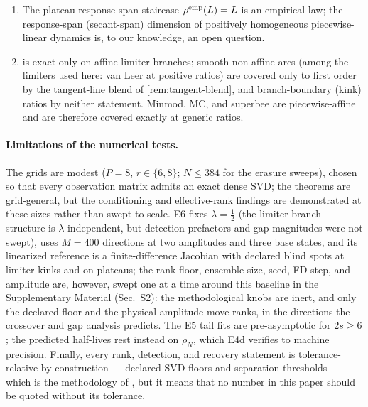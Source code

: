 \documentclass[pdflatex,sn-mathphys-num]{sn-jnl}%
\theoremstyle{thmstyleone}%
\theoremstyle{thmstyletwo}%
\theoremstyle{thmstylethree}%
\begin{document}
\begin{enumerate}
\item[(v)] The plateau response-span staircase $\rho^{\rm emp}(L)=L$ is an empirical law; the response-span (secant-span) dimension of positively homogeneous piecewise-linear dynamics is, to our knowledge, an open question.
\item[(vi)]  is exact only on affine limiter branches; smooth non-affine arcs (among the limiters used here: van Leer at positive ratios) are covered only to first order by the tangent-line blend of \cref{rem:tangent-blend}, and branch-boundary (kink) ratios by neither statement.
      Minmod, MC, and superbee are piecewise-affine and are therefore covered exactly at generic ratios.
\end{enumerate}

\paragraph{Limitations of the numerical tests.}
The grids are modest ($P=8$, $r\in\{6,8\}$; $N\le384$ for the erasure sweeps), chosen so that every observation matrix admits an exact dense SVD; the theorems are grid-general, but the conditioning and effective-rank findings are demonstrated at these sizes rather than swept to scale.
E6 fixes $\lambda=\tfrac12$ (the limiter branch structure is $\lambda$-independent, but detection prefactors and gap magnitudes were not swept), uses $M=400$ directions at two amplitudes and three base states, and its linearized reference is a finite-difference Jacobian with declared blind spots at limiter kinks and on plateaus; the rank floor, ensemble size, seed, FD step, and amplitude are, however, swept one at a time around this baseline in the Supplementary Material (Sec.~S2): the methodological knobs are inert, and only the declared floor and the physical amplitude move ranks, in the directions the crossover and gap analysis predicts.
The E5 tail fits are pre-asymptotic for $2s\ge6$; the predicted half-lives rest instead on $\rho_N$, which E4d verifies to machine precision.
Finally, every rank, detection, and recovery statement is tolerance-relative by construction --- declared SVD floors and separation thresholds --- which is the methodology of \cite{PolemitisChristakisDrikakis2026FVerasure, PolemitisChristakisDrikakis2026onestep}, but it means that no number in this paper should be quoted without its tolerance.
\end{document}
